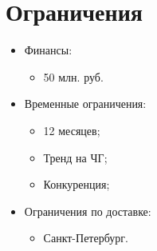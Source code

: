\documentclass[a4paper,8pt]{article}
\begin{document}
\section*{Ограничения}

    \begin{itemize}
        \item Финансы:
            \begin{itemize}
                \item 50 млн. руб.
            \end{itemize}
        \item Временные ограничения:
            \begin{itemize}
                \item 12 месяцев;
                \item Тренд на ЧГ;
                \item Конкуренция;
            \end{itemize}
        \item Ограничения по доставке:
            \begin{itemize}
                \item Санкт-Петербург.
            \end{itemize}
    \end{itemize}
\end{document}
